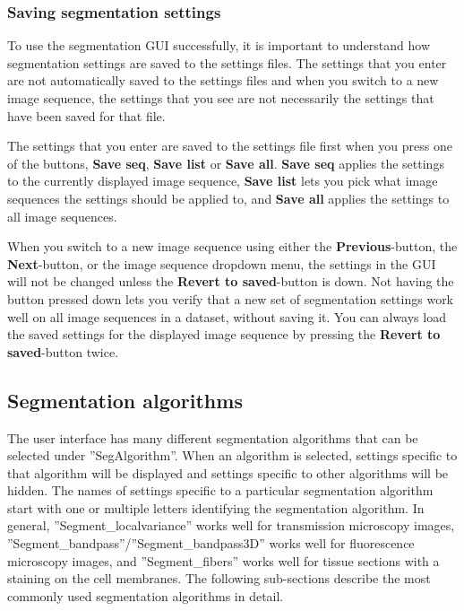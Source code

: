 \documentclass[a4paper, oneside, onecolumn, 11pt]{article}
\newcommand{\setting}[1]{''#1''}
\newcommand{\control}[1]{\textbf{#1}}
\begin{document}
\subsubsection{Saving segmentation settings}
To use the segmentation GUI successfully, it is important to understand how segmentation settings are saved to the settings files. The settings that you enter are not automatically saved to the settings files and when you switch to a new image sequence, the settings that you see are not necessarily the settings that have been saved for that file.

The settings that you enter are saved to the settings file first when you press one of the buttons, \control{Save seq}, \control{Save list} or \control{Save all}. \control{Save seq} applies the settings to the currently displayed image sequence, \control{Save list} lets you pick what image sequences the settings should be applied to, and \control{Save all} applies the settings to all image sequences.

When you switch to a new image sequence using either the \control{Previous}-button, the \control{Next}-button, or the image sequence dropdown menu, the settings in the GUI will not be changed unless the \control{Revert to saved}-button is down. Not having the button pressed down lets you verify that a new set of segmentation settings work well on all image sequences in a dataset, without saving it. You can always load the saved settings for the displayed image sequence by pressing the \control{Revert to saved}-button twice.

\subsection{Segmentation algorithms}
\label{sec:segmentation-algorithms}
The user interface has many different segmentation algorithms that can be selected under \setting{SegAlgorithm}. When an algorithm is selected, settings specific to that algorithm will be displayed and settings specific to other algorithms will be hidden. The names of settings specific to a particular segmentation algorithm start with one or multiple letters identifying the segmentation algorithm. In general, \setting{Segment\_localvariance} works well for transmission microscopy images, \setting{Segment\_bandpass}/\setting{Segment\_bandpass3D} works well for fluorescence microscopy images, and \setting{Segment\_fibers} works well for tissue sections with a staining on the cell membranes. The following sub-sections describe the most commonly used segmentation algorithms in detail.
\end{document}
